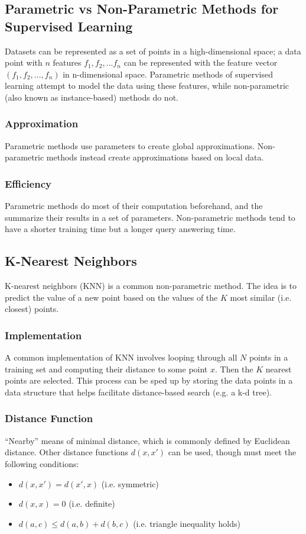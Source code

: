 \documentclass[12pt,titlepage]{article}
\begin{document}
    \subsection{Parametric vs Non-Parametric Methods for Supervised Learning}
      Datasets can be represented as a set of points in a high-dimensional space; a data point with $n$ features $f_1, f_2, ... f_n$ can be represented
      with the feature vector $(f_1, f_2, ..., f_n)$ in n-dimensional space. Parametric methods of supervised learning attempt to model the data using
      these features, while non-parametric (also known as instance-based) methods do not.

      \subsubsection{Approximation}
        Parametric methods use parameters to create global approximations. Non-parametric methods instead create approximations based on local data.

      \subsubsection{Efficiency}
        Parametric methods do most of their computation beforehand, and the summarize their results in a set of parameters. Non-parametric methods tend to
        have a shorter training time but a longer query answering time.

    \subsection{K-Nearest Neighbors}
      K-nearest neighbors (KNN) is a common non-parametric method. The idea is to predict the value of a new point based on the values of the $K$ most similar
      (i.e. closest) points.

      \subsubsection{Implementation}
        A common implementation of KNN involves looping through all $N$ points in a training set and computing their distance to some point $x$. Then the $K$ nearest
        points are selected. This process can be sped up by storing the data points in a data structure that helps facilitate distance-based search (e.g. a k-d tree).

      \subsubsection{Distance Function}
        ``Nearby'' means of minimal distance, which is commonly defined by Euclidean distance. Other distance functions $d(x, x')$ can be used, though must meet
        the following conditions:
        \begin{itemize}
          \item $d(x, x') = d(x', x)$ (i.e. symmetric)
          \item $d(x, x) = 0$ (i.e. definite)
          \item $d(a, c) \leq d(a, b) + d(b, c)$ (i.e. triangle inequality holds)
        \end{itemize}
\end{document}
